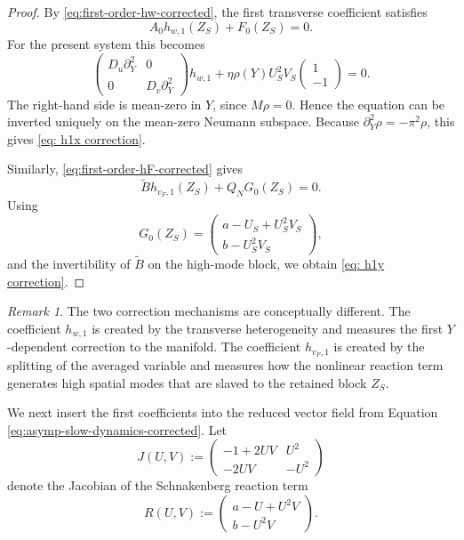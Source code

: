 \documentclass[11pt]{article}
\theoremstyle{definition}
\theoremstyle{remark}
\newtheorem{remark}[theorem]{Remark}
\numberwithin{equation}{section}
\begin{document}
\begin{proof}
By \eqref{eq:first-order-hw-corrected}, the first transverse coefficient satisfies
\[
A_0h_{w,1}(Z_S)+F_0(Z_S)=0.
\]
For the present system this becomes
\[
\begin{pmatrix}
D_u\partial_Y^2 & 0\\
0 & D_v\partial_Y^2
\end{pmatrix}
h_{w,1}
+
\eta\rho(Y)U_S^2V_S
\begin{pmatrix}
1\\
-1
\end{pmatrix}
=0.
\]
The right-hand side is mean-zero in \(Y\), since \(M\rho=0\). Hence the
equation can be inverted uniquely on the mean-zero Neumann subspace. Because
\(\partial_Y^2\rho=-\pi^2\rho\), this gives \eqref{eq: h1x correction}.

Similarly, \eqref{eq:first-order-hF-corrected} gives
\[
\widetilde B h_{v_F,1}(Z_S)+Q_NG_0(Z_S)=0.
\]
Using
\[
G_0(Z_S)=
\begin{pmatrix}
a-U_S+U_S^2V_S\\
b-U_S^2V_S
\end{pmatrix},
\]
and the invertibility of \(\widetilde B\) on the high-mode block, we obtain
\eqref{eq: h1y correction}.
\end{proof}

\begin{remark}
    The two correction mechanisms are conceptually different. The coefficient \(h_{w,1}\) is created by the transverse heterogeneity and measures the first \(Y\)-dependent correction to the manifold. 
    The coefficient \(h_{v_F,1}\) is created by the splitting of the averaged variable and measures how the nonlinear reaction term generates high spatial modes that are slaved to the retained block \(Z_S\). 
\end{remark}

We next insert the first coefficients into the reduced vector field from Equation \ref{eq:asymp-slow-dynamics-corrected}. Let
\[
J(U,V):=
\begin{pmatrix}
-1+2UV & U^2\\
-2UV & -U^2
\end{pmatrix}
\]
denote the Jacobian of the Schnakenberg reaction term
\[
R(U,V):=
\begin{pmatrix}
a-U+U^2V\\
b-U^2V
\end{pmatrix}.
\]
\end{document}
